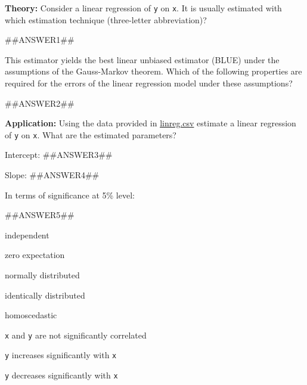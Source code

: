 
\begin{question}
\textbf{Theory:} Consider a linear regression of \texttt{y} on \texttt{x}. It is usually estimated with
which estimation technique (three-letter abbreviation)?

##ANSWER1##

This estimator yields the best linear unbiased estimator (BLUE) under the assumptions
of the Gauss-Markov theorem. Which of the following properties are required for the
errors of the linear regression model under these assumptions?

##ANSWER2##

\textbf{Application:} Using the data provided in \url{linreg.csv} estimate a
linear regression of \texttt{y} on \texttt{x}. What are the estimated parameters?

Intercept: ##ANSWER3##

Slope: ##ANSWER4##

In terms of significance at 5\% level:

##ANSWER5##

\begin{answerlist}
  \item 
  \item independent
  \item zero expectation
  \item normally distributed
  \item identically distributed
  \item homoscedastic
  \item 
  \item 
  \item \texttt{x} and \texttt{y} are not significantly correlated
  \item \texttt{y} increases significantly with \texttt{x}
  \item \texttt{y} decreases significantly with \texttt{x}
\end{answerlist}
\end{question}

